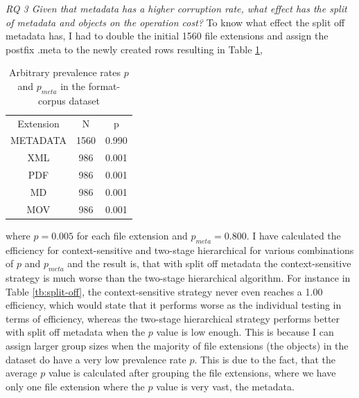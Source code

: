 \textit{RQ 3 Given that metadata has a higher corruption rate, what effect has the split of metadata and objects on the operation cost?}
To know what effect the split off metadata has, I had to double the initial 1560 file extensions and assign the postfix .meta to the newly created rows resulting in Table \ref{tb:metadata},
\begin{table}[H]
    \caption{Arbitrary prevalence rates $p$ and $p_{meta}$ in the format-corpus dataset}
    \centering
    \begin{tabular}{c c c}
    \label{tb:metadata}
    Extension & N & p\\
    METADATA & 1560 & 0.990 \\
    XML& 986 & 0.001 \\
    PDF& 986 & 0.001 \\
    MD& 986 & 0.001 \\
    MOV& 986 & 0.001 
    \end{tabular}
\end{table}
where $p=0.005$ for each file extension and $p_{meta}=0.800$. 
I have calculated the efficiency for context-sensitive and two-stage hierarchical for various combinations of $p$ and $p_{meta}$ and the result is, that with split off metadata the context-sensitive strategy is much worse than the two-stage hierarchical algorithm.
For instance in Table \ref{tb:split-off}, the context-sensitive strategy never even reaches a 1.00 efficiency, which would state that it performs worse as the individual testing in terms of efficiency, whereas the two-stage hierarchical strategy performs better with split off metadata when the $p$ value is low enough. This is because I can assign larger group sizes when the majority of file extensions (the objects) in the dataset do have a very low prevalence rate $p$. This is due to the fact, that the average $p$ value is calculated after grouping the file extensions, where we have only one file extension where the $p$ value is very vast, the metadata.
